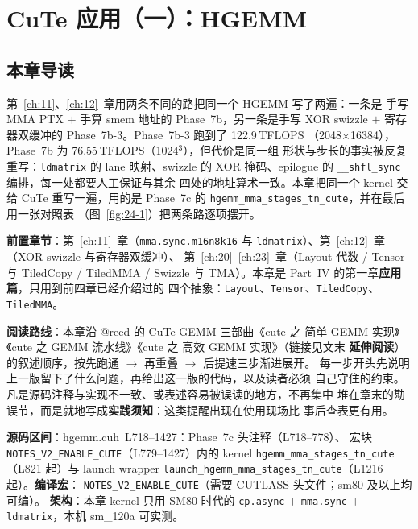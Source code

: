 \makeatletter
\providecommand{\urlchbrk}[1]{\@tfor\next:=#1\do{\next\allowbreak}}
\makeatother
\providecommand{\url}[1]{{\ttfamily\urlchbrk{#1}}}
\chapter{CuTe 应用（一）：HGEMM}\label{ch:24}

\section{本章导读}

第~\ref{ch:11}、\ref{ch:12}~章用两条不同的路把同一个 HGEMM 写了两遍：一条是
手写 MMA PTX $+$ 手算 smem 地址的 Phase~7b，另一条是手写 XOR swizzle $+$
寄存器双缓冲的 Phase~7b-3。Phase~7b-3 跑到了 122.9\,TFLOPS
（2048$\times$16384），Phase~7b 为 76.55\,TFLOPS（1024$^3$），但代价是同一组
形状与步长的事实被反复重写：\texttt{ldmatrix} 的 lane 映射、swizzle 的
XOR 掩码、epilogue 的 \texttt{\_\_shfl\_sync} 编排，每一处都要人工保证与其余
四处的地址算术一致。本章把同一个 kernel 交给 CuTe 重写一遍，用的是 Phase~7c 的
\texttt{hgemm\_\allowbreak{}mma\_\allowbreak{}stages\_\allowbreak{}tn\_\allowbreak{}cute}，并在最后用一张对照表
（图~\ref{fig:24-1}）把两条路逐项摆开。

\textbf{前置章节}：第~\ref{ch:11}~章（\texttt{mma.\allowbreak{}sync.\allowbreak{}m16n8k16} 与
\texttt{ldmatrix}）、第~\ref{ch:12}~章（XOR swizzle 与寄存器双缓冲）、
第~\ref{ch:20}--\ref{ch:23}~章（Layout 代数 / Tensor 与 TiledCopy / TiledMMA /
Swizzle 与 TMA）。本章是 Part~IV 的第一章\textbf{应用篇}，只用到前四章已经介绍过的
四个抽象：\texttt{Layout}、\texttt{Tensor}、\texttt{TiledCopy}、
\texttt{TiledMMA}。

\textbf{阅读路线}：本章沿 @reed 的 CuTe GEMM 三部曲《cute 之 简单 GEMM
实现》《cute 之 GEMM 流水线》《cute 之 高效 GEMM 实现》（链接见文末
\textbf{延伸阅读}）的叙述顺序，按先跑通 $\to$ 再重叠 $\to$ 后提速三步渐进展开。
每一步开头先说明上一版留下了什么问题，再给出这一版的代码，以及读者必须
自己守住的约束。凡是源码注释与实现不一致、或表述容易被误读的地方，不再集中
堆在章末的勘误节，而是就地写成\textbf{实践须知}：这类提醒出现在使用现场比
事后查表更有用。

\textbf{源码区间}：hgemm.cuh~L718--1427：Phase~7c 头注释（L718--778）、
宏块 \texttt{NOTES\_\allowbreak{}V2\_\allowbreak{}ENABLE\_\allowbreak{}CUTE}（L779--1427）内的 kernel
\texttt{hgemm\_\allowbreak{}mma\_\allowbreak{}stages\_\allowbreak{}tn\_\allowbreak{}cute}（L821 起）与 launch wrapper
\texttt{launch\_\allowbreak{}hgemm\_\allowbreak{}mma\_\allowbreak{}stages\_\allowbreak{}tn\_\allowbreak{}cute}（L1216 起）。\textbf{编译宏}：
\texttt{NOTES\_\allowbreak{}V2\_\allowbreak{}ENABLE\_\allowbreak{}CUTE}（需要 CUTLASS 头文件；sm80 及以上均可编）。
\textbf{架构}：本章 kernel 只用 SM80 时代的 \texttt{cp.async} $+$
\texttt{mma.sync} $+$ \texttt{ldmatrix}，本机 sm\_120a 可实测。

